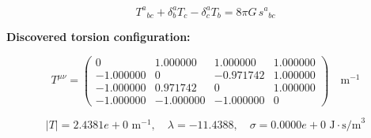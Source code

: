
\begin{equation}
  T^a{}_{bc} + \delta^a_b T_c - \delta^a_c T_b = 8\pi G \, s^a{}_{bc}
\end{equation}

\textbf{Discovered torsion configuration:}

\begin{equation}
  T^{\mu\nu} = \begin{pmatrix}
    0 & 1.000000 & 1.000000 & 1.000000 \\
    -1.000000 & 0 & -0.971742 & 1.000000 \\
    -1.000000 & 0.971742 & 0 & 1.000000 \\
    -1.000000 & -1.000000 & -1.000000 & 0
  \end{pmatrix} \quad \text{m}^{-1}
\end{equation}

\begin{equation}
  |T| = 2.4381e+0 \text{ m}^{-1}, \quad
  \lambda = -11.4388, \quad
  \sigma = 0.0000e+0 \text{ J}\cdot\text{s/m}^3
\end{equation}